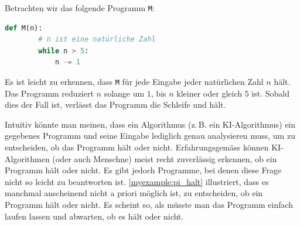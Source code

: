 \begin{myexample}\label{myexample:haltendesProgramm}
	Betrachten wir das folgende Programm \lstinline{M}:
	\begin{lstlisting}[language=Python,escapechar=!]
	def M(n):
		# n ist eine natürliche Zahl
		while n > 5:
			n -= 1
	\end{lstlisting}
Es ist leicht zu erkennen, dass \lstinline{M} für jede Eingabe jeder natürlichen Zahl $n$ hält. Das Programm reduziert $n$ solange um $1$, bis $n$ kleiner oder gleich $5$ ist. Sobald dies der Fall ist, verlässt das Programm die Schleife und hält.
\end{myexample}

Intuitiv könnte man meinen, dass ein Algorithmus (z.\,B. ein KI-Algorithmus) ein gegebenes Programm und seine Eingabe lediglich genau analysieren muss, um zu entscheiden, ob das Programm hält oder nicht. Erfahrungsgemäss können KI-Algorithmen (oder auch Menschne) meist recht zuverlässig erkennen, ob ein Programm hält oder nicht. Es gibt jedoch Programme, bei denen diese Frage nicht so leicht zu beantworten ist. \cref{myexample:pi_halt} illustriert, dass es manchmal anscheinend nicht a priori möglich ist, zu entscheiden, ob ein Programm hält oder nicht. Es scheint so, als müsste man das Programm einfach laufen lassen und abwarten, ob es hält oder nicht.

